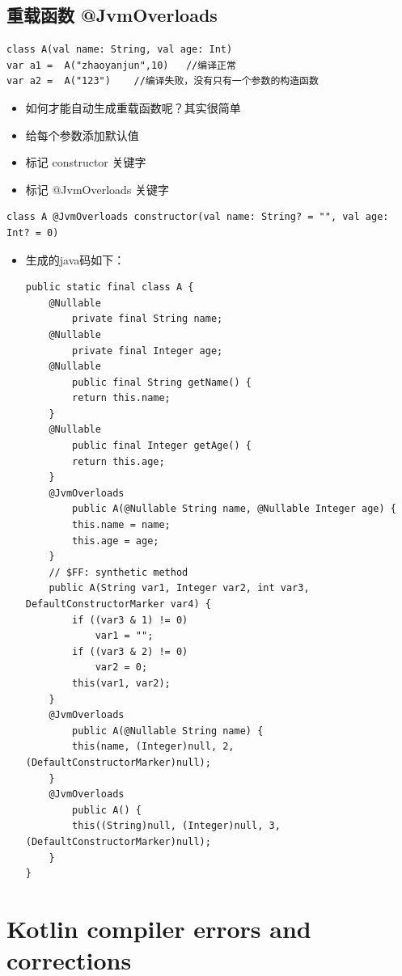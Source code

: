 \documentclass[9pt, b5paper]{article}
\begin{document}
\subsection{重载函数 @JvmOverloads}
\label{sec-6-6}
\begin{verbatim}
class A(val name: String, val age: Int)
var a1 =  A("zhaoyanjun",10)   //编译正常
var a2 =  A("123")    //编译失败，没有只有一个参数的构造函数
\end{verbatim}
\begin{itemize}
\item 如何才能自动生成重载函数呢？其实很简单
\item 给每个参数添加默认值
\item 标记 constructor 关键字
\item 标记 @JvmOverloads 关键字
\end{itemize}
\begin{verbatim}
class A @JvmOverloads constructor(val name: String? = "", val age: Int? = 0)
\end{verbatim}
\begin{itemize}
\item 生成的java码如下：
\begin{verbatim}
public static final class A {
    @Nullable
        private final String name;
    @Nullable
        private final Integer age;
    @Nullable
        public final String getName() {
        return this.name;
    }
    @Nullable
        public final Integer getAge() {
        return this.age;
    }
    @JvmOverloads
        public A(@Nullable String name, @Nullable Integer age) {
        this.name = name;
        this.age = age;
    }
    // $FF: synthetic method
    public A(String var1, Integer var2, int var3, DefaultConstructorMarker var4) {
        if ((var3 & 1) != 0) 
            var1 = "";
        if ((var3 & 2) != 0) 
            var2 = 0;
        this(var1, var2);
    }
    @JvmOverloads
        public A(@Nullable String name) {
        this(name, (Integer)null, 2, (DefaultConstructorMarker)null);
    }
    @JvmOverloads
        public A() {
        this((String)null, (Integer)null, 3, (DefaultConstructorMarker)null);
    }
}
\end{verbatim}
\end{itemize}


\section{Kotlin compiler errors and corrections}
\label{sec-7}
\end{document}
